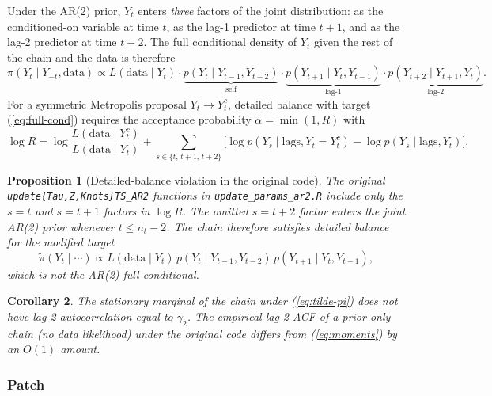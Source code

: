 \documentclass[11pt]{article}
\newcommand{\eref}[1]{(\ref{#1})}
\theoremstyle{plain}
\newtheorem{proposition}{Proposition}[section]
\newtheorem{corollary}[proposition]{Corollary}
\theoremstyle{definition}
\theoremstyle{remark}
\begin{document}
Under the AR(2) prior, $Y_t$ enters \emph{three} factors of the joint
distribution: as the conditioned-on variable at time $t$, as the lag-1
predictor at time $t+1$, and as the lag-2 predictor at time $t+2$. The
full conditional density of $Y_t$ given the rest of the chain and the
data is therefore
\begin{equation}\label{eq:full-cond}
  \pi(Y_t \mid Y_{-t}, \text{data})
  \propto L(\text{data} \mid Y_t) \cdot
  \underbrace{p(Y_t \mid Y_{t-1}, Y_{t-2})}_{\text{self}}\cdot
  \underbrace{p(Y_{t+1} \mid Y_t, Y_{t-1})}_{\text{lag-1}}\cdot
  \underbrace{p(Y_{t+2} \mid Y_{t+1}, Y_t)}_{\text{lag-2}}.
\end{equation}
For a symmetric Metropolis proposal $Y_t \to Y_t^c$, detailed balance with
target \eref{eq:full-cond} requires the acceptance probability
$\alpha = \min(1, R)$ with
\begin{equation}\label{eq:fix2-R}
  \log R = \log\frac{L(\text{data} \mid Y_t^c)}{L(\text{data} \mid Y_t)}
          + \sum_{s \in \{t,\,t+1,\,t+2\}} \!\!\!
            \bigl[\log p(Y_s \mid \text{lags}, Y_t = Y_t^c) - \log p(Y_s \mid \text{lags}, Y_t)\bigr].
\end{equation}

\begin{proposition}[Detailed-balance violation in the original code]\label{prop:fix2}
The original \texttt{update\{Tau,Z,Knots\}TS\_AR2} functions in
\texttt{update\_params\_ar2.R} include only the $s = t$ and $s = t+1$
factors in $\log R$. The omitted $s = t+2$ factor enters the joint AR(2)
prior whenever $t \leq n_t - 2$. The chain therefore satisfies detailed
balance for the modified target
\begin{equation}\label{eq:tilde-pi}
  \widetilde\pi(Y_t \mid \cdots) \propto
  L(\text{data} \mid Y_t)\, p(Y_t \mid Y_{t-1}, Y_{t-2})\, p(Y_{t+1} \mid Y_t, Y_{t-1}),
\end{equation}
which is not the AR(2) full conditional.
\end{proposition}

\begin{corollary}\label{cor:acf}
The stationary marginal of the chain under \eref{eq:tilde-pi} does not
have lag-2 autocorrelation equal to $\gamma_2$. The empirical lag-2 ACF
of a prior-only chain (no data likelihood) under the original code differs
from \eref{eq:moments} by an $O(1)$ amount.
\end{corollary}

\subsubsection{Patch}
\end{document}
